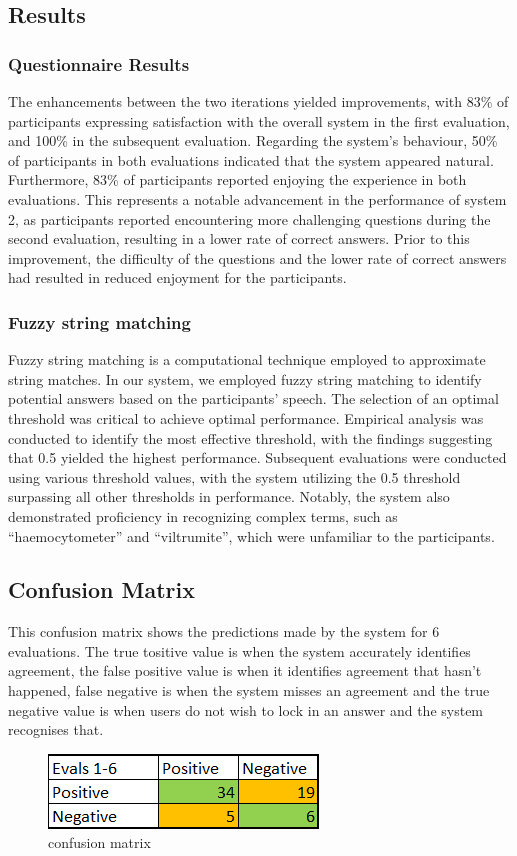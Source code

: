 \documentclass[hidelinks, 11pt]{article}
\begin{document}
\subsection{Results}
\label{subsec:results}

\subsubsection{Questionnaire Results}
The enhancements between the two iterations yielded improvements, with 83\% of participants expressing satisfaction with the overall system in the first evaluation, and 100\% in the subsequent evaluation. Regarding the system's behaviour, 50\% of participants in both evaluations indicated that the system appeared natural. Furthermore, 83\% of participants reported enjoying the experience in both evaluations. This represents a notable advancement in the performance of system 2, as participants reported encountering more challenging questions during the second evaluation, resulting in a lower rate of correct answers. Prior to this improvement, the difficulty of the questions and the lower rate of correct answers had resulted in reduced enjoyment for the participants.

\subsubsection{Fuzzy string matching}
\label{subsec:fuzzy_string}
Fuzzy string matching is a computational technique employed to approximate string matches. In our system, we employed fuzzy string matching to identify potential answers based on the participants' speech. The selection of an optimal threshold was critical to achieve optimal performance. Empirical analysis was conducted to identify the most effective threshold, with the findings suggesting that 0.5 yielded the highest performance. Subsequent evaluations were conducted using various threshold values, with the system utilizing the 0.5 threshold surpassing all other thresholds in performance. Notably, the system also demonstrated proficiency in recognizing complex terms, such as ``haemocytometer'' and ``viltrumite'', which were unfamiliar to the participants.

\subsection{Confusion Matrix}
This confusion matrix shows the predictions made by the system for 6 evaluations. The true tositive value is when the system accurately identifies agreement, the false positive value is when it identifies agreement that hasn't happened, false negative is when the system misses an agreement and the true negative value is when users do not wish to lock in an answer and the system recognises that.
\begin{figure}[!ht]
    \centering
    \includegraphics{images/1-6.png}
    \caption{confusion matrix}
\end{figure}
\end{document}
